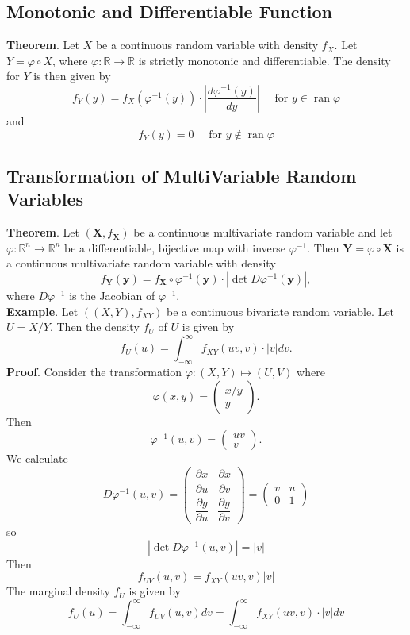 \documentclass[a4paper,12pt]{article}
\begin{document}
    \subsection{Monotonic and Differentiable Function}
    \textbf{Theorem}. Let $X$ be a continuous random variable with density $f_X$. Let $Y=\varphi \circ X$, where $\varphi: \mathbb{R} \rightarrow \mathbb{R}$ is strictly monotonic and differentiable. The density for $Y$ is then given by
$$
f_Y(y)=f_X\left(\varphi^{-1}(y)\right) \cdot\left|\frac{d \varphi^{-1}(y)}{d y}\right| \quad \text { for } y \in \operatorname{ran} \varphi
$$
and
$$
f_Y(y)=0 \quad \text { for } y \notin \operatorname{ran} \varphi
$$

    \subsection{Transformation of MultiVariable Random Variables}
    \textbf{Theorem}. Let $\left(\boldsymbol{X}, f_{\boldsymbol{X}}\right)$ be a continuous multivariate random variable and let $\varphi: \mathbb{R}^n \rightarrow \mathbb{R}^n$ be a differentiable, bijective map with inverse $\varphi^{-1}$. Then $\boldsymbol{Y}=\varphi \circ \boldsymbol{X}$ is a continuous multivariate random variable with density
$$
f_{\boldsymbol{Y}}(\boldsymbol{y})=f_{\boldsymbol{X}} \circ \varphi^{-1}(\boldsymbol{y}) \cdot\left|\operatorname{det} D \varphi^{-1}(\boldsymbol{y})\right|,
$$
where $D \varphi^{-1}$ is the Jacobian of $\varphi^{-1}$.\\
    \textbf{Example}. Let $\left((X, Y), f_{X Y}\right)$ be a continuous bivariate random variable. Let $U=X / Y$. Then the density $f_U$ of $U$ is given by
    $$
    f_U(u)=\int_{-\infty}^{\infty} f_{X Y}(u v, v) \cdot|v| d v .
    $$
    \textbf{Proof}. 
    Consider the transformation $\varphi:(X, Y) \mapsto(U, V)$ where
    $$
    \varphi(x, y)=\left(\begin{array}{c}
    x / y \\
    y
    \end{array}\right) .
    $$
    Then
    $$
    \varphi^{-1}(u, v)=\left(\begin{array}{c}
    u v \\
    v
    \end{array}\right) .
    $$
We calculate
$$
D \varphi^{-1}(u, v)=\left(\begin{array}{ll}
\dfrac{\partial x}{\partial u} & \dfrac{\partial x}{\partial v} \\
\dfrac{\partial y}{\partial u} & \dfrac{\partial y}{\partial v}
\end{array}\right)=\left(\begin{array}{ll}
v & u \\
0 & 1
\end{array}\right)
$$
so
$$
\left|\operatorname{det} D \varphi^{-1}(u, v)\right|=|v|
$$
Then
$$
f_{U V}(u, v)=f_{X Y}(u v, v)|v|
$$
The marginal density $f_U$ is given by
$$
f_U(u)=\int_{-\infty}^{\infty} f_{U V}(u, v) d v=\int_{-\infty}^{\infty} f_{X Y}(u v, v) \cdot|v| d v
$$
\end{document}

